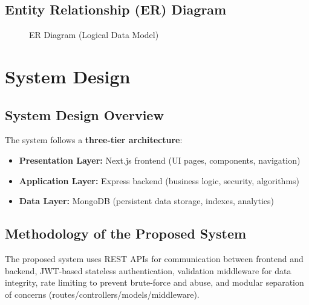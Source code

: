 \documentclass[12pt,a4paper]{report}
\begin{document}
\section{Entity Relationship (ER) Diagram}
\begin{figure}[p]
\centering
\caption{ER Diagram (Logical Data Model)}
\end{figure}

\chapter{System Design}
\section{System Design Overview}
The system follows a \textbf{three-tier architecture}:
\begin{itemize}[leftmargin=*]
  \item \textbf{Presentation Layer:} Next.js frontend (UI pages, components, navigation)
  \item \textbf{Application Layer:} Express backend (business logic, security, algorithms)
  \item \textbf{Data Layer:} MongoDB (persistent data storage, indexes, analytics)
\end{itemize}

\section{Methodology of the Proposed System}
The proposed system uses REST APIs for communication between frontend and backend, JWT-based stateless authentication, validation middleware for data integrity, rate limiting to prevent brute-force and abuse, and modular separation of concerns (routes/controllers/models/middleware).
\end{document}

